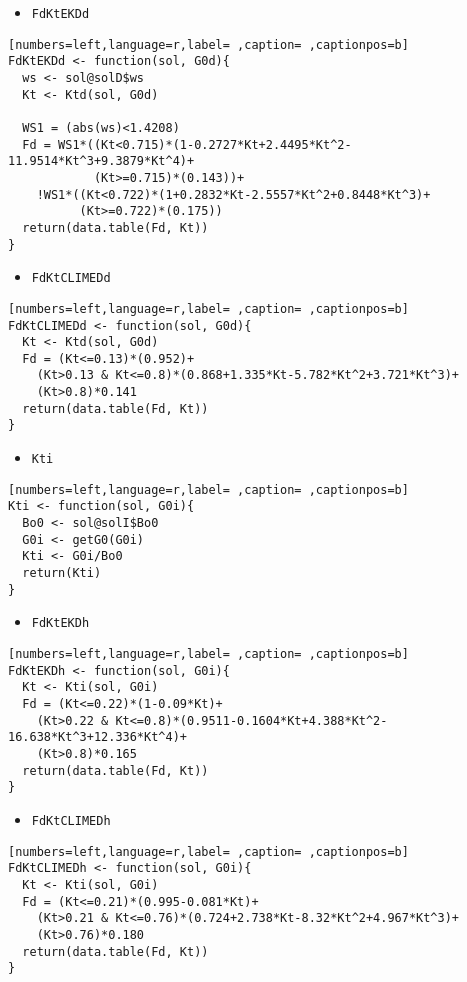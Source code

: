 \begin{itemize}
\item \texttt{FdKtEKDd}
\end{itemize}
\begin{lstlisting}[numbers=left,language=r,label= ,caption= ,captionpos=b]
FdKtEKDd <- function(sol, G0d){
  ws <- sol@solD$ws
  Kt <- Ktd(sol, G0d)
  
  WS1 = (abs(ws)<1.4208)
  Fd = WS1*((Kt<0.715)*(1-0.2727*Kt+2.4495*Kt^2-11.9514*Kt^3+9.3879*Kt^4)+
            (Kt>=0.715)*(0.143))+
    !WS1*((Kt<0.722)*(1+0.2832*Kt-2.5557*Kt^2+0.8448*Kt^3)+
          (Kt>=0.722)*(0.175))
  return(data.table(Fd, Kt))
}
\end{lstlisting}
\begin{itemize}
\item \texttt{FdKtCLIMEDd}
\end{itemize}
\begin{lstlisting}[numbers=left,language=r,label= ,caption= ,captionpos=b]
FdKtCLIMEDd <- function(sol, G0d){
  Kt <- Ktd(sol, G0d)
  Fd = (Kt<=0.13)*(0.952)+
    (Kt>0.13 & Kt<=0.8)*(0.868+1.335*Kt-5.782*Kt^2+3.721*Kt^3)+
    (Kt>0.8)*0.141
  return(data.table(Fd, Kt))
}
\end{lstlisting}
\begin{itemize}
\item \texttt{Kti}
\end{itemize}
\begin{lstlisting}[numbers=left,language=r,label= ,caption= ,captionpos=b]
Kti <- function(sol, G0i){
  Bo0 <- sol@solI$Bo0
  G0i <- getG0(G0i)
  Kti <- G0i/Bo0
  return(Kti)
}
\end{lstlisting}
\begin{itemize}
\item \texttt{FdKtEKDh}
\end{itemize}
\begin{lstlisting}[numbers=left,language=r,label= ,caption= ,captionpos=b]
FdKtEKDh <- function(sol, G0i){
  Kt <- Kti(sol, G0i)
  Fd = (Kt<=0.22)*(1-0.09*Kt)+
    (Kt>0.22 & Kt<=0.8)*(0.9511-0.1604*Kt+4.388*Kt^2-16.638*Kt^3+12.336*Kt^4)+
    (Kt>0.8)*0.165
  return(data.table(Fd, Kt))
}
\end{lstlisting}
\begin{itemize}
\item \texttt{FdKtCLIMEDh}
\end{itemize}
\begin{lstlisting}[numbers=left,language=r,label= ,caption= ,captionpos=b]
FdKtCLIMEDh <- function(sol, G0i){
  Kt <- Kti(sol, G0i)
  Fd = (Kt<=0.21)*(0.995-0.081*Kt)+
    (Kt>0.21 & Kt<=0.76)*(0.724+2.738*Kt-8.32*Kt^2+4.967*Kt^3)+
    (Kt>0.76)*0.180
  return(data.table(Fd, Kt))
}
\end{lstlisting}
